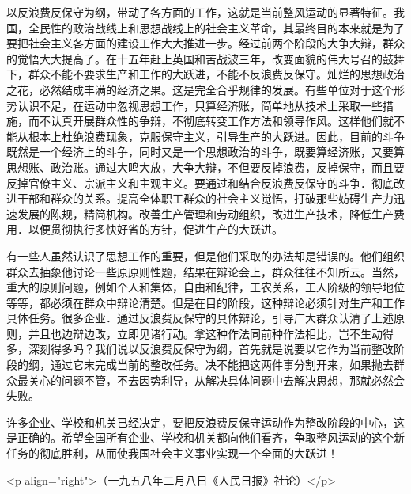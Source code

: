 以反浪费反保守为纲，带动了各方面的工作，这就是当前整风运动的显著特征。我国，全民性的政治战线上和思想战线上的社会主义革命，其最终目的本来就是为了要把社会主义各方面的建设工作大大推进一步。经过前两个阶段的大争大辩，群众的觉悟大大提高了。在十五年赶上英国和苦战波三年，改变面貌的伟大号召的鼓舞下，群众不能不要求生产和工作的大跃进，不能不反浪费反保守。灿烂的思想政治之花，必然结成丰满的经济之果。这是完全合乎规律的发展。有些单位对于这个形势认识不足，在运动中忽视思想工作，只算经济账，简单地从技术上采取一些措施，而不认真开展群众性的争辩，不彻底转变工作方法和领导作风。这样他们就不能从根本上杜绝浪费现象，克服保守主义，引导生产的大跃进。因此，目前的斗争既然是一个经济上的斗争，同时又是一个思想政治的斗争，既要算经济账，又要算思想账、政治账。通过大鸣大放，大争大辩，不但要反掉浪费，反掉保守，而且要反掉官僚主义、宗派主义和主观主义。要通过和结合反浪费反保守的斗争．彻底改进干部和群众的关系。提高全体职工群众的社会主义觉悟，打破那些妨碍生产力迅速发展的陈规，精简机构。改善生产管理和劳动组织，改进生产技术，降低生产费用．以便贯彻执行多快好省的方针，促进生产的大跃进。

有一些人虽然认识了思想工作的重要，但是他们采取的办法却是错误的。他们组织群众去抽象他讨论一些原原则性题，结果在辩论会上，群众往往不知所云。当然，重大的原则问题，例如个人和集体，自由和纪律，工农关系，工人阶级的领导地位等等，都必须在群众中辩论清楚。但是在目的阶段，这种辩论必须针对生产和工作具体任务。很多企业．通过反浪费反保守的具体辩论，引导广大群众认清了上述原则，并且也边辩边改，立即见诸行动。拿这种作法同前种作法相比，岂不生动得多，深刻得多吗？我们说以反浪费反保守为纲，首先就是说要以它作为当前整改阶段的纲，通过它末完成当前的整改任务。决不能把这两件事分割开来，如果抛去群众最关心的问题不管，不去因势利导，从解决具体问题中去解决思想，那就必然会失败。

许多企业、学校和机关已经决定，要把反浪费反保守运动作为整改阶段的中心，这是正确的。希望全国所有企业、学校和机关都向他们看齐，争取整风运动的这个新任务的彻底胜利，从而使我国社会主义事业实现一个全面的大跃进！

<p align="right">（一九五八年二月八日《人民日报》社论）</p>

